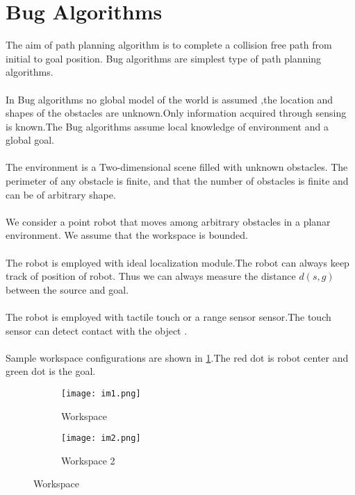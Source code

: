 \documentclass[fontsize=12pt, %
                             paper=a4, %
                             oneside, %
                             captions=tableheading,
                             index=totoc,
                             hyperref]{labbook}
\begin{document}
\section{Bug Algorithms}
The aim of path planning algorithm is to complete a collision free path from initial to goal position.
Bug algorithms are simplest type of path planning algorithms.
\\\\
In Bug algorithms no global model of the world is assumed ,the location and shapes
of the obstacles are unknown.Only information
acquired through sensing is known.The Bug algorithms assume local knowledge of environment and a global goal.
\\\\
The environment is a Two-dimensional scene filled with unknown obstacles.
The perimeter of any obstacle is finite, and that the number of obstacles is finite
and can be of arbitrary shape.
\\\\
We consider a point robot that moves among arbitrary
obstacles in a planar environment. We assume that the workspace is bounded. 
\\\\
The robot is employed with ideal localization module.The robot can always keep track of position of robot.
Thus we can always measure the distance $d(s,g)$ between the source and goal.
\\\\
The robot is employed with tactile touch or a range sensor sensor.The touch sensor can detect
contact with the object .
\\\\

Sample workspace configurations are shown in \ref{fig:1}.The red dot is robot center
and green dot is the goal.
\begin{figure}[!htbp]
\begin{subfigure}[b]{0.5\textwidth}
                 \centering
                 \texttt{[image: im1.png]}
                 \caption{Workspace}
\end{subfigure}                
\begin{subfigure}[b]{0.5\textwidth}
                 \centering
                 \texttt{[image: im2.png]}
                 \caption{Workspace 2}
  		 
\end{subfigure}  
\caption{Workspace}
\label{fig:1}
\end{figure}
\end{document}
